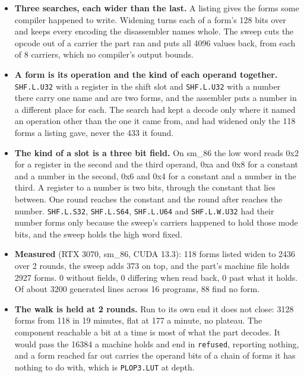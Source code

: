 \begin{enumerate}
\begin{itemize}
\item \textbf{Three searches, each wider than the last.} A listing gives the forms some compiler happened to write. Widening turns each of a form's 128 bits over and keeps every encoding the disassembler names whole. The sweep cuts the opcode out of a carrier the part ran and puts all 4096 values back, from each of 8 carriers, which no compiler's output bounds.
\item \textbf{A form is its operation and the kind of each operand together.} \texttt{SHF.\allowbreak{}L.\allowbreak{}U32} with a register in the shift slot and \texttt{SHF.\allowbreak{}L.\allowbreak{}U32} with a number there carry one name and are two forms, and the assembler puts a number in a different place for each. The search had kept a decode only where it named an operation other than the one it came from, and had widened only the 118 forms a listing gave, never the 433 it found.
\item \textbf{The kind of a slot is a three bit field.} On sm\_\allowbreak{}86 the low word reads 0x2 for a register in the second and the third operand, 0xa and 0x8 for a constant and a number in the second, 0x6 and 0x4 for a constant and a number in the third. A register to a number is two bits, through the constant that lies between. One round reaches the constant and the round after reaches the number. \texttt{SHF.\allowbreak{}L.\allowbreak{}S32}, \texttt{SHF.\allowbreak{}L.\allowbreak{}S64}, \texttt{SHF.\allowbreak{}L.\allowbreak{}U64} and \texttt{SHF.\allowbreak{}L.\allowbreak{}W.\allowbreak{}U32} had their number forms only because the sweep's carriers happened to hold those mode bits, and the sweep holds the high word fixed.
\item \textbf{Measured} (RTX 3070, sm\_\allowbreak{}86, CUDA 13.3): 118 forms listed widen to 2436 over 2 rounds, the sweep adds 373 on top, and the part's machine file holds 2927 forms. 0 without fields, 0 differing when read back, 0 past what it holds. Of about 3200 generated lines across 16 programs, 88 find no form.
\item \textbf{The walk is held at 2 rounds.} Run to its own end it does not close: 3128 forms from 118 in 19 minutes, flat at 177 a minute, no plateau. The component reachable a bit at a time is most of what the part decodes. It would pass the 16384 a machine holds and end in \texttt{refused}, reporting nothing, and a form reached far out carries the operand bits of a chain of forms it has nothing to do with, which is \texttt{PLOP3.\allowbreak{}LUT} at depth.

\end{itemize}
\end{enumerate}
